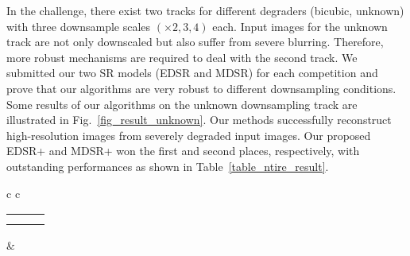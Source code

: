 \documentclass[10pt,twocolumn,letterpaper]{article}
\begin{document}
	In the challenge, there exist two tracks for different degraders (bicubic, unknown) with three downsample scales $(\times 2, 3, 4)$ each.
	Input images for the unknown track are not only downscaled but also suffer from severe blurring.
	Therefore, more robust mechanisms are required to deal with the second track.
	We submitted our two SR models (EDSR and MDSR) for each competition and prove that our algorithms are very robust to different downsampling conditions.
	Some results of our algorithms on the unknown downsampling track are illustrated in Fig.~\ref{fig_result_unknown}. Our methods successfully reconstruct high-resolution images from severely degraded input images.
	Our proposed EDSR+ and MDSR+ won the first and second places, respectively, with outstanding performances as shown in Table~\ref{table_ntire_result}. 
	\begin{figure*}[t]
		\captionsetup[subfloat]{labelformat=empty}
		\begin{center}
			\newcommand{\rowArg}{2.46cm}
			\newcommand{\fullSize}{5.56cm}
			\newcommand{\fullHalf}{2.78cm}
			\newcommand{\patchSize}{2.3cm}
			\scriptsize
			\setlength\tabcolsep{0.1cm}
			\begin{tabular}[b]{c c}
				\begin{tabular}[b]{c c c}
					\multirow{2}{*}[\rowArg]{
						\subfloat[0791 from DIV2K~\cite{Timofte_2017_CVPR_Workshops}]
						{\includegraphics[width = \fullHalf, height = \fullSize]
							{figs/val_0791_Full_cut.png}}} &
					\subfloat[HR \protect\linebreak(PSNR / SSIM)]
					{\includegraphics[width = \patchSize, height = \patchSize]
						{figs/val_0791_GT.png}} &
					\subfloat[Bicubic \protect\linebreak(22.20 dB / 0.7979)]
					{\includegraphics[width = \patchSize, height = \patchSize]
						{figs/val_0791_Bicubic.png}} \\ [-0.2cm] &
					\subfloat[\textbf{EDSR (Ours)} \protect\linebreak(\textcolor{red}{29.05 dB} / \textcolor{red}{0.9257})]
					{\includegraphics[width = \patchSize, height = \patchSize]
						{figs/val_0791_Ours_Single.png}} &
					\subfloat[\textbf{MDSR (Ours)} \protect\linebreak(\textcolor{blue}{28.96 dB} / \textcolor{blue}{0.9244})]
					{\includegraphics[width = \patchSize, height = \patchSize]
						{figs/val_0791_Ours_Multi.png}} 
				\end{tabular}
				&  
				\begin{tabular}[b]{c c c}

\end{tabular}
\end{tabular}
\end{center}
\end{figure*}
\end{document}
